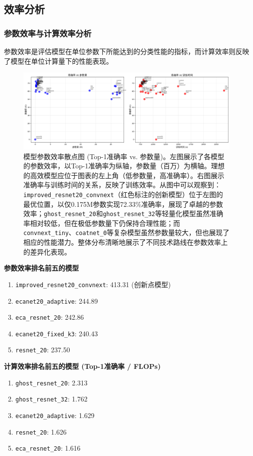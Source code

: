 \documentclass[a4paper]{article}
\begin{document}
\subsection{效率分析}
\subsubsection{参数效率与计算效率分析}
参数效率是评估模型在单位参数下所能达到的分类性能的指标，而计算效率则反映了模型在单位计算量下的性能表现。

\begin{figure}[H]
    \centering
    \includegraphics[width=\textwidth]{fig/efficiency_analysis.png}
    \caption{模型参数效率散点图 (Top-1准确率 vs. 参数量)。左图展示了各模型的参数效率，以Top-1准确率为纵轴，参数量（百万）为横轴。理想的高效模型应位于图表的左上角（低参数量，高准确率）。右图展示准确率与训练时间的关系，反映了训练效率。从图中可以观察到：\texttt{improved\_resnet20\_convnext}（红色标注的创新模型）位于左图的最优位置，以仅0.175M参数实现72.33\%准确率，展现了卓越的参数效率；\texttt{ghost\_resnet\_20}和\texttt{ghost\_resnet\_32}等轻量化模型虽然准确率相对较低，但在极低参数量下仍保持合理性能；而\texttt{convnext\_tiny}、\texttt{coatnet\_0}等复杂模型虽然参数量较大，但也展现了相应的性能潜力。整体分布清晰地展示了不同技术路线在参数效率上的差异化表现。}
    \label{fig:efficiency_analysis}
\end{figure}

\textbf{参数效率排名前五的模型}
\begin{enumerate}
    \item \texttt{improved\_resnet20\_convnext}: 413.31 (创新点模型)
    \item \texttt{ecanet20\_adaptive}: 244.89
    \item \texttt{eca\_resnet\_20}: 242.86
    \item \texttt{ecanet20\_fixed\_k3}: 240.43
    \item \texttt{resnet\_20}: 237.50
\end{enumerate}

\textbf{计算效率排名前五的模型 (Top-1准确率 / FLOPs)}
\begin{enumerate}
    \item \texttt{ghost\_resnet\_20}: 2.313
    \item \texttt{ghost\_resnet\_32}: 1.762
    \item \texttt{ecanet20\_adaptive}: 1.629
    \item \texttt{resnet\_20}: 1.626
    \item \texttt{eca\_resnet\_20}: 1.616
\end{enumerate}
\end{document}
